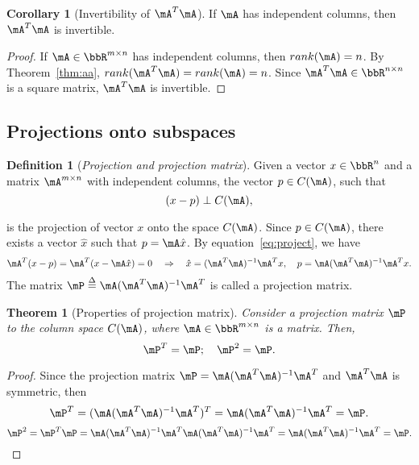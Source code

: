 \documentclass[11pt]{article}
\theoremstyle{plain}
\newtheorem{thm}{Theorem}[section]
\theoremstyle{definition}
\newtheorem{defn}{Definition}
\newtheorem{cor}{Corollary}
\begin{document}
\begin{cor}[Invertibility of $\mA^T \mA$]\label{cor:invert}
	If $\mA$ has independent columns, then $\mA^T \mA$ is invertible.
\end{cor}
\begin{proof}
	If $\mA \in \bbR^{m \times n}$ has independent columns, then $rank(\mA) = n$. By Theorem~\ref{thm:aa}, $rank(\mA^T \mA) = rank(\mA) = n$. Since $\mA^T \mA \in \bbR^{n \times n}$ is a square matrix, $\mA^T \mA$ is invertible.
\end{proof}


\subsection{Projections onto subspaces}
\begin{defn}[\textit{Projection and projection matrix}]\label{def:project}
	Given a vector $x \in \bbR^{n}$ and a matrix $\mA^{m \times n}$ with independent columns, the vector $p \in C(\mA)$, such that
	\begin{equation}\label{eq:project}
		(x-p) \perp C(\mA),
	\end{equation} 
	
	is the projection of vector $x$ onto the space $C(\mA)$. Since $p \in C(\mA)$, there exists a vector $\hat x$ such that $p = \mA \hat x$. By equation~\eqref{eq:project}, we have
	\[ \mA^T (x - p) = \mA^T(x - \mA \hat x) = 0  \quad  \Rightarrow\quad  \hat x = (\mA^T \mA)^{-1} \mA^T x,\quad p = \mA(\mA^T \mA)^{-1} \mA^T x.  \] 
	The matrix $\mP \overset{\Delta}{=}   \mA(\mA^T \mA)^{-1} \mA^T$ is called a projection matrix.
\end{defn}

\begin{thm}[Properties of projection matrix]\label{thm:projectm}
	Consider a projection matrix $\mP$ to the column space $C(\mA)$, where $\mA \in \bbR^{m \times n}$ is a matrix. Then,
	\begin{equation}\label{eq:projectm}
		\mP^T = \mP;\quad  \mP^2 = \mP.
	\end{equation}
\end{thm}
\begin{proof}
	Since the projection matrix $\mP =   \mA(\mA^T \mA)^{-1} \mA^T$ and $\mA^T \mA$ is symmetric, then
	\[  \mP^T = (\mA(\mA^T \mA)^{-1} \mA^T )^T = \mA (\mA^T \mA)^{-1} \mA^T = \mP. \]
	\[  \mP^2 = \mP^T \mP =  \mA (\mA^T \mA)^{-1} \mA^T  \mA (\mA^T \mA)^{-1} \mA^T =  \mA (\mA^T \mA)^{-1} \mA^T = \mP. \]
\end{proof}
\end{document}
